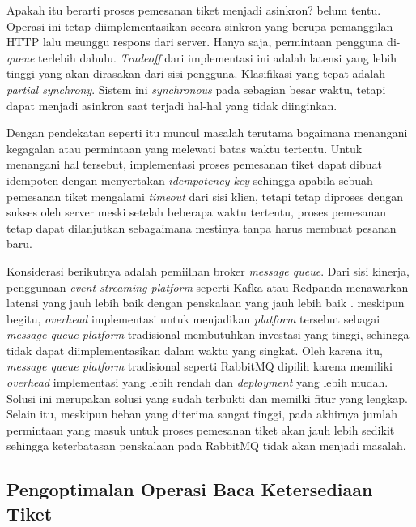 Apakah itu berarti proses pemesanan tiket menjadi asinkron? belum tentu. Operasi ini tetap diimplementasikan secara sinkron yang berupa pemanggilan HTTP lalu meunggu respons dari server. Hanya saja, permintaan pengguna di-\textit{queue} terlebih dahulu. \textit{Tradeoff} dari implementasi ini adalah latensi yang lebih tinggi yang akan dirasakan dari sisi pengguna. Klasifikasi yang tepat adalah \textit{partial synchrony}. Sistem ini \textit{synchronous} pada sebagian besar waktu, tetapi dapat menjadi asinkron saat terjadi hal-hal yang tidak diinginkan.

Dengan pendekatan seperti itu muncul masalah terutama bagaimana menangani kegagalan atau permintaan yang melewati batas waktu tertentu. Untuk menangani hal tersebut, implementasi proses pemesanan tiket dapat dibuat idempoten dengan menyertakan \textit{idempotency key} sehingga apabila sebuah pemesanan tiket mengalami \textit{timeout} dari sisi klien, tetapi tetap diproses dengan sukses oleh server meski setelah beberapa waktu tertentu, proses pemesanan tetap dapat dilanjutkan sebagaimana mestinya tanpa harus membuat pesanan baru.

Konsiderasi berikutnya adalah pemiilhan broker \textit{message queue}. Dari sisi kinerja, penggunaan \textit{event-streaming platform} seperti Kafka atau Redpanda menawarkan latensi yang jauh lebih baik dengan penskalaan yang jauh lebih baik \parencite{comparingKafkaAlternatives}. meskipun begitu, \textit{overhead} implementasi untuk menjadikan \textit{platform} tersebut sebagai \textit{message queue platform} tradisional membutuhkan investasi yang tinggi, sehingga tidak dapat diimplementasikan dalam waktu yang singkat. Oleh karena itu, \textit{message queue platform} tradisional seperti RabbitMQ dipilih karena memiliki \textit{overhead} implementasi yang lebih rendah dan \textit{deployment} yang lebih mudah. Solusi ini merupakan solusi yang sudah terbukti dan memilki fitur yang lengkap. Selain itu, meskipun beban yang diterima sangat tinggi, pada akhirnya jumlah permintaan yang masuk untuk proses pemesanan tiket akan jauh lebih sedikit sehingga keterbatasan penskalaan pada RabbitMQ tidak akan menjadi masalah.

\subsection{Pengoptimalan Operasi Baca Ketersediaan Tiket}
